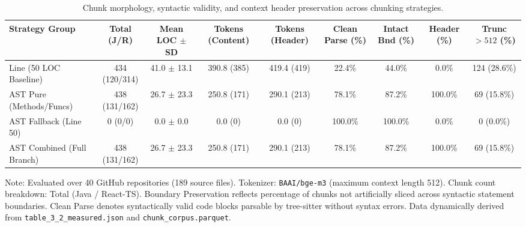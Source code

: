 \begin{table}[t]
\caption{Chunk morphology, syntactic validity, and context header preservation across chunking strategies.}
\label{tab:chunk_morphology}
\centering\scriptsize
\setlength{\tabcolsep}{2.5pt}
\begin{threeparttable}
\begin{tabular}{@{}lcccccccc@{}}
\toprule
Strategy Group & Total (J/R) & Mean LOC $\pm$ SD & Tokens (Content) & Tokens (Header) & Clean Parse (\%) & Intact Bnd (\%) & Header (\%) & Trunc $>512$ (\%) \\
\midrule
Line (50 LOC Baseline) & 434 (120/314) & 41.0 $\pm$ 13.1 & 390.8 (385) & 419.4 (419) & 22.4\% & 44.0\% & 0.0\% & 124 (28.6\%) \\
\cmidrule(lr){1-9}
AST Pure (Methods/Funcs) & 438 (131/162) & 26.7 $\pm$ 23.3 & 250.8 (171) & 290.1 (213) & 78.1\% & 87.2\% & 100.0\% & 69 (15.8\%) \\
AST Fallback (Line 50) & 0 (0/0) & 0.0 $\pm$ 0.0 & 0.0 (0) & 0.0 (0) & 100.0\% & 100.0\% & 0.0\% & 0 (0.0\%) \\
AST Combined (Full Branch) & 438 (131/162) & 26.7 $\pm$ 23.3 & 250.8 (171) & 290.1 (213) & 78.1\% & 87.2\% & 100.0\% & 69 (15.8\%) \\
\bottomrule
\end{tabular}
\begin{tablenotes}\footnotesize
\item[] Note: Evaluated over 40 GitHub repositories (189 source files). Tokenizer: \texttt{BAAI/bge-m3} (maximum context length 512). Chunk count breakdown: Total (Java / React-TS). Boundary Preservation reflects percentage of chunks not artificially sliced across syntactic statement boundaries. Clean Parse denotes syntactically valid code blocks parsable by tree-sitter without syntax errors. Data dynamically derived from \texttt{table\_3\_2\_measured.json} and \texttt{chunk\_corpus.parquet}.
\end{tablenotes}
\end{threeparttable}
\end{table}